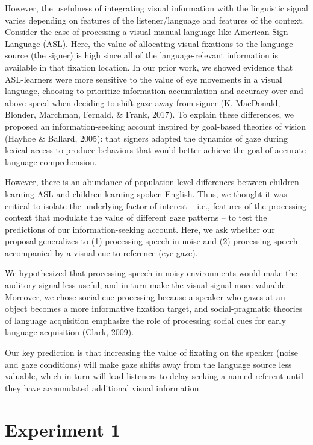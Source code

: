 \documentclass[10pt, letterpaper]{article}
\begin{document}
However, the usefulness of integrating visual information with the
linguistic signal varies depending on features of the listener/language
and features of the context. Consider the case of processing a
visual-manual language like American Sign Language (ASL). Here, the
value of allocating visual fixations to the language source (the signer)
is high since all of the language-relevant information is available in
that fixation location. In our prior work, we showed evidence that
ASL-learners were more sensitive to the value of eye movements in a
visual language, choosing to prioritize information accumulation and
accuracy over and above speed when deciding to shift gaze away from
signer (K. MacDonald, Blonder, Marchman, Fernald, \& Frank, 2017). To
explain these differences, we proposed an information-seeking account
inspired by goal-based theories of vision (Hayhoe \& Ballard, 2005):
that signers adapted the dynamics of gaze during lexical access to
produce behaviors that would better achieve the goal of accurate
language comprehension.

However, there is an abundance of population-level differences between
children learning ASL and children learning spoken English. Thus, we
thought it was critical to isolate the underlying factor of interest --
i.e., features of the processing context that modulate the value of
different gaze patterns -- to test the predictions of our
information-seeking account. Here, we ask whether our proposal
generalizes to (1) processing speech in noise and (2) processing speech
accompanied by a visual cue to reference (eye gaze).

We hypothesized that processing speech in noisy environments would make
the auditory signal less useful, and in turn make the visual signal more
valuable. Moreover, we chose social cue processing because a speaker who
gazes at an object becomes a more informative fixation target, and
social-pragmatic theories of language acquisition emphasize the role of
processing social cues for early language acquisition (Clark, 2009).

Our key prediction is that increasing the value of fixating on the
speaker (noise and gaze conditions) will make gaze shifts away from the
language source less valuable, which in turn will lead listeners to
delay seeking a named referent until they have accumulated additional
visual information.

\section{Experiment 1}\label{experiment-1}
\end{document}
